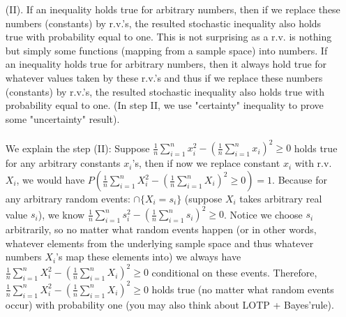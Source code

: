 \begin{exercise} [BH.6.12]
\begin{solution}
\begin{enumerate}
{\begin{enumerate}
			We also prove the above inequality using traditional approach in this note (see equations (1) and (2) in the later discussions).
			\item[(II).] If an inequality holds true for arbitrary numbers, then if we replace these numbers (constants) by r.v.'s, the resulted stochastic inequality also holds true with probability equal to one. This is not surprising as a r.v. is nothing but simply some functions (mapping from a sample space) into numbers.  If an inequality holds true for arbitrary numbers, then it always hold true for whatever values taken by these r.v.'s and thus  if we replace these numbers (constants) by r.v.'s, the resulted stochastic inequality also holds true with probability equal to one. (In step II, {  we use "certainty" inequality to prove some "uncertainty" result}).\\~\\
			We explain the step (II): Suppose $\frac{1}{n}\sum_{i=1}^n  x_i^2  -  ( \frac{1}{n}\sum_{i=1}^n  x_i )^2 \geq 0$  holds true for any arbitrary constants $x_i$'s, then if now we replace constant $x_i$ with r.v. $X_i$, we would have $P\left(\frac{1}{n}\sum_{i=1}^n  X_i^2  -  ( \frac{1}{n}\sum_{i=1}^n  X_i )^2 \geq 0 \right)=1$.
			Because for any arbitrary random events: $\cap \{X_i=s_i\}$ (suppose $X_i$ takes arbitrary real value $s_i$), we know $\frac{1}{n}\sum_{i=1}^n  s_i^2  -  ( \frac{1}{n}\sum_{i=1}^n  s_i )^2 \geq 0$. Notice we choose $s_i$ arbitrarily, so no matter what random events happen (or in other words, whatever elements from the underlying sample space and thus whatever numbers $X_i$'s map these elements into) we always have $\frac{1}{n}\sum_{i=1}^n  X_i^2  -  ( \frac{1}{n}\sum_{i=1}^n  X_i )^2 \geq 0$ conditional on these events.  Therefore, $\frac{1}{n}\sum_{i=1}^n  X_i^2  -  ( \frac{1}{n}\sum_{i=1}^n  X_i )^2 \geq 0$ holds true (no matter what random events occur) with probability one (you may also think about LOTP + Bayes'rule).
		\end{enumerate}}
	

\end{enumerate}
\end{solution}
\end{exercise}
